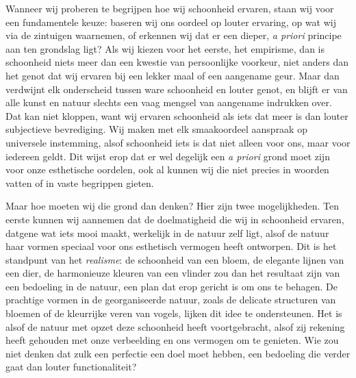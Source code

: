 \begin{mdframed}[leftmargin=0pt,rightmargin=0pt,backgroundcolor=blue!6,linecolor=white,innertopmargin=6pt,innerbottommargin=6pt]

Wanneer wij proberen te begrijpen hoe wij schoonheid ervaren, staan wij voor een fundamentele keuze: baseren wij ons oordeel op louter ervaring, op wat wij via de zintuigen waarnemen, of erkennen wij dat er een dieper, \textit{a priori} principe aan ten grondslag ligt? Als wij kiezen voor het eerste, het empirisme, dan is schoonheid niets meer dan een kwestie van persoonlijke voorkeur, niet anders dan het genot dat wij ervaren bij een lekker maal of een aangename geur. Maar dan verdwijnt elk onderscheid tussen ware schoonheid en louter genot, en blijft er van alle kunst en natuur slechts een vaag mengsel van aangename indrukken over. Dat kan niet kloppen, want wij ervaren schoonheid als iets dat meer is dan louter subjectieve bevrediging. Wij maken met elk smaakoordeel aanspraak op universele instemming, alsof schoonheid iets is dat niet alleen voor ons, maar voor iedereen geldt. Dit wijst erop dat er wel degelijk een \textit{a priori} grond moet zijn voor onze esthetische oordelen, ook al kunnen wij die niet precies in woorden vatten of in vaste begrippen gieten.

Maar hoe moeten wij die grond dan denken? Hier zijn twee mogelijkheden. Ten eerste kunnen wij aannemen dat de doelmatigheid die wij in schoonheid ervaren, datgene wat iets mooi maakt, werkelijk in de natuur zelf ligt, alsof de natuur haar vormen speciaal voor ons esthetisch vermogen heeft ontworpen. Dit is het standpunt van het \textit{realisme}: de schoonheid van een bloem, de elegante lijnen van een dier, de harmonieuze kleuren van een vlinder zou dan het resultaat zijn van een bedoeling in de natuur, een plan dat erop gericht is om ons te behagen. De prachtige vormen in de georganiseerde natuur, zoals de delicate structuren van bloemen of de kleurrijke veren van vogels, lijken dit idee te ondersteunen. Het is alsof de natuur met opzet deze schoonheid heeft voortgebracht, alsof zij rekening heeft gehouden met onze verbeelding en ons vermogen om te genieten. Wie zou niet denken dat zulk een perfectie een doel moet hebben, een bedoeling die verder gaat dan louter functionaliteit?


\end{mdframed}
